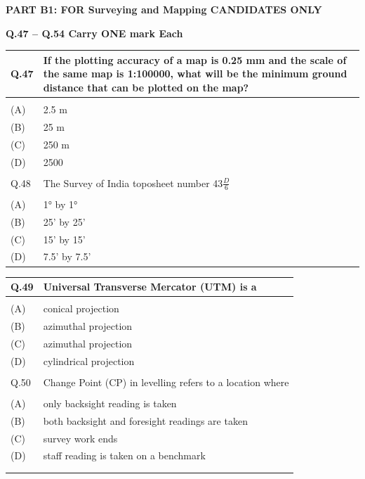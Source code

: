 \documentclass[12pt]{article}
\begin{document}
\newpage

\textbf{PART B1: FOR Surveying and Mapping CANDIDATES ONLY} 

\textbf{Q.47 – Q.54 Carry ONE mark Each} \\

\begin{table}[H]
\renewcommand{\arraystretch}{3}
\setlength{\tabcolsep}{8pt}
\begin{tabular}{|l|p{15cm}|}
\hline
 
Q.47& If the plotting accuracy of a map is 0.25 mm and the scale of the same map is
1:100000, what will be the minimum ground distance that can be plotted on the
map?\\ \hline 
 & \\ \hline
(A)&2.5 m\\ \hline
(B)&25 m\\ \hline
(C)&250 m\\ \hline
(D)&2500\\ \hline
 & \\ \hline

Q.48 & The Survey of India toposheet number 43$\frac{D}{6}$ \\ \hline
 & \\ \hline
(A)&1° by 1°\\ \hline
(B)&25' by 25'\\ \hline
(C)&15' by 15'\\ \hline
(D)&7.5' by 7.5'\\ \hline

\end{tabular}
\end{table}

\begin{table}[H]
\renewcommand{\arraystretch}{3}
\setlength{\tabcolsep}{8pt}
\begin{tabular}{|l|p{15cm}|}
\hline
 
Q.49& Universal Transverse Mercator (UTM) is a\\ \hline 
 & \\ \hline
(A)&conical projection\\ \hline
(B)&azimuthal projection\\ \hline
(C)&azimuthal projection\\ \hline
(D)&cylindrical projection\\ \hline
 & \\ \hline

Q.50 & Change Point (CP) in levelling refers to a location where\\ \hline
 & \\ \hline
(A)&only backsight reading is taken\\ \hline
(B)&both backsight and foresight readings are taken\\ \hline
(C)&survey work ends\\ \hline
(D)&staff reading is taken on a benchmark\\ \hline

& \\ 
& \\ \hline

\end{tabular}
\end{table}
\end{document}
